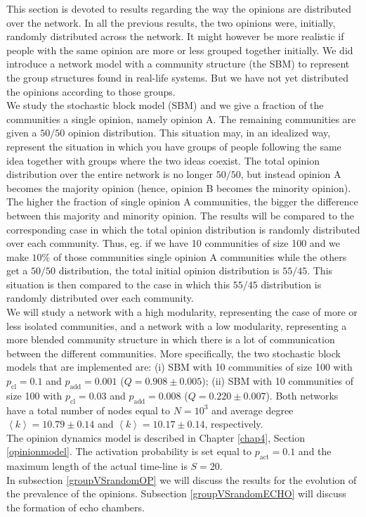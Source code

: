 \documentclass[11 pt , letterpaper , twoside , openright]{book}
\begin{document}
This section is devoted to results regarding the way the opinions are distributed over the network. In all the previous results, the two opinions were, initially, randomly distributed across the network. It might however be more realistic if people with the same opinion are more or less grouped together initially. We did introduce a network model with a community structure (the SBM) to represent the group structures found in real-life systems. But we have not yet distributed the opinions according to those groups. \\
\newline
We study the stochastic block model (SBM) and we give a fraction of the communities a single opinion, namely opinion A. The remaining communities are given a $50/50$ opinion distribution. This situation may, in an idealized way, represent the situation in which you have groups of people following the same idea together with groups where the two ideas coexist. The total opinion distribution over the entire network is no longer $50/50$, but instead opinion A becomes the majority opinion (hence, opinion B becomes the minority opinion). The higher the fraction of single opinion A communities, the bigger the difference between this majority and minority opinion. The results will be compared to the corresponding case in which the total opinion distribution is randomly distributed over each community. Thus, eg. if we have 10 communities of size 100 and we make $10 \%$ of those communities single opinion A communities while the others get a $50/50$ distribution, the total initial opinion distribution is $55/45$. This situation is then compared to the case in which this $55/45$ distribution is randomly distributed over each community.\\ 
\newline
We will study a network with a high modularity, representing the case of more or less isolated communities, and a network with a low modularity, representing a more blended community structure in which there is a lot of communication between the different communities. More specifically, the two stochastic block models that are implemented are: (i) SBM with 10 communities of size 100 with $p_{\text{cl}} = 0.1$ and $p_{\text{add}} = 0.001$ ($Q = 0.908 \pm 0.005$); (ii) SBM with 10 communities of size 100 with $p_{\text{cl}} = 0.03$ and $p_{\text{add}} = 0.008$ ($Q = 0.220 \pm 0.007$). Both networks have a total number of nodes equal to $N = 10^3$ and average degree $\left<k\right> = 10.79 \pm 0.14$ and $\left<k\right> = 10.17 \pm 0.14$, respectively.\\
\newline
The opinion dynamics model is described in Chapter \ref{chap4}, Section \ref{opinionmodel}. The activation probability is set equal to $p_{\text{act}} = 0.1$ and the maximum length of the actual time-line is $S=20$. \\
\newline
In subsection \ref{groupVSrandomOP} we will discuss the results for the evolution of the prevalence of the opinions. Subsection \ref{groupVSrandomECHO} will discuss the formation of echo chambers.
\end{document}
